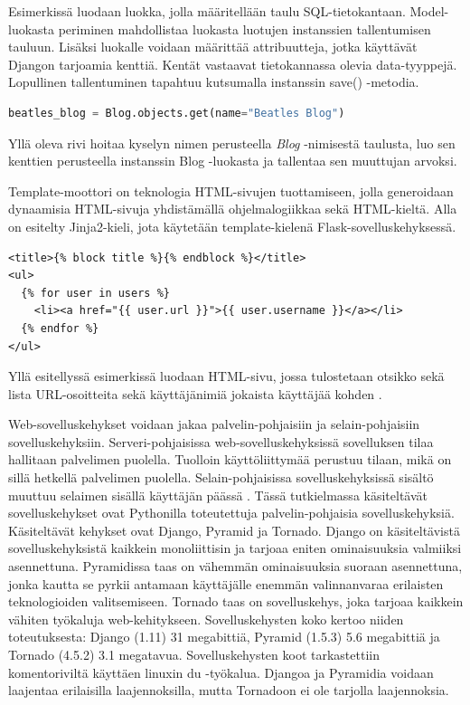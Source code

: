 \documentclass[utf8]{gradu3}
\begin{document}
Esimerkissä luodaan luokka, jolla määritellään taulu SQL-tietokantaan. Model-luokasta periminen mahdollistaa luokasta luotujen instanssien tallentumisen tauluun. Lisäksi
luokalle voidaan määrittää attribuutteja, jotka käyttävät Djangon tarjoamia kenttiä. Kentät vastaavat tietokannassa olevia data-tyyppejä. Lopullinen tallentuminen
tapahtuu kutsumalla instanssin save() -metodia.


\begin{lstlisting}[language=Python]
beatles_blog = Blog.objects.get(name="Beatles Blog")
\end{lstlisting}

Yllä oleva rivi hoitaa kyselyn nimen perusteella \emph{Blog} -nimisestä taulusta, luo sen kenttien perusteella instanssin Blog -luokasta ja tallentaa sen muuttujan arvoksi.


Template-moottori on teknologia HTML-sivujen tuottamiseen, jolla generoidaan dynaamisia HTML-sivuja yhdistämällä ohjelmalogiikkaa sekä HTML-kieltä. Alla on esitelty Jinja2-kieli, jota käytetään template-kielenä Flask-sovelluskehyksessä.
\pagebreak

\begin{lstlisting}[language=Smalltalk]
<title>{% block title %}{% endblock %}</title>
<ul>
  {% for user in users %}
	<li><a href="{{ user.url }}">{{ user.username }}</a></li>
  {% endfor %}
</ul>
\end{lstlisting}

Yllä esitellyssä esimerkissä luodaan HTML-sivu, jossa tulostetaan otsikko sekä lista URL-osoitteita sekä käyttäjänimiä jokaista käyttäjää kohden \parencite{jinja}.

Web-sovelluskehykset voidaan jakaa palvelin-pohjaisiin ja selain-pohjaisiin sovelluskehyksiin. Serveri-pohjaisissa web-sovelluskehyksissä sovelluksen tilaa hallitaan palvelimen puolella. Tuolloin käyttöliittymää perustuu tilaan, mikä on sillä hetkellä palvelimen puolella. Selain-pohjaisissa sovelluskehyksissä sisältö muuttuu selaimen sisällä käyttäjän päässä \parencite{vosloo}. Tässä tutkielmassa käsiteltävät sovelluskehykset ovat Pythonilla toteutettuja palvelin-pohjaisia sovelluskehyksiä. Käsiteltävät kehykset ovat Django, Pyramid ja Tornado. Django on käsiteltävistä sovelluskehyksistä kaikkein monoliittisin ja tarjoaa eniten ominaisuuksia valmiiksi asennettuna. Pyramidissa taas on vähemmän ominaisuuksia suoraan asennettuna, jonka kautta se pyrkii antamaan käyttäjälle enemmän valinnanvaraa erilaisten teknologioiden valitsemiseen. Tornado taas on sovelluskehys, joka tarjoaa kaikkein vähiten työkaluja web-kehitykseen. Sovelluskehysten koko kertoo niiden toteutuksesta: Django (1.11) 31 megabittiä, Pyramid (1.5.3) 5.6 megabittiä ja Tornado (4.5.2) 3.1 megatavua. Sovelluskehysten koot tarkastettiin komentoriviltä käyttäen linuxin du -työkalua. Djangoa ja Pyramidia voidaan laajentaa erilaisilla laajennoksilla, mutta Tornadoon ei ole tarjolla laajennoksia. 
\end{document}
